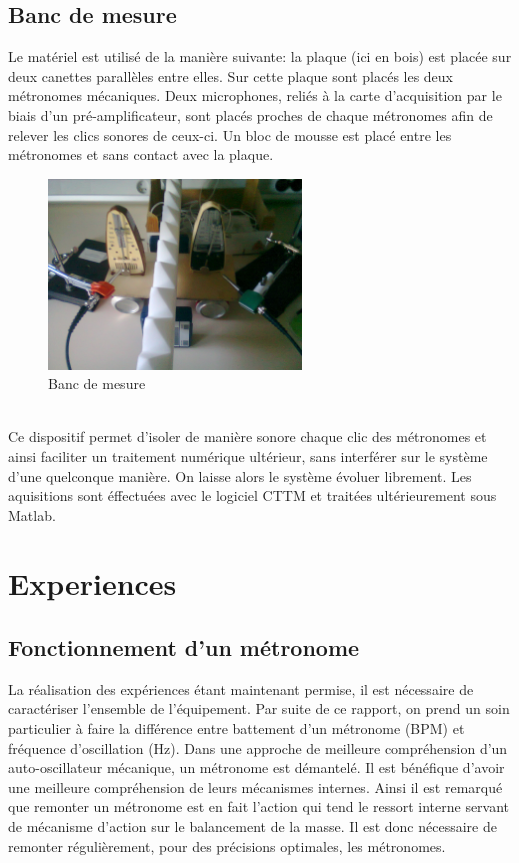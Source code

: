 \documentclass[a4paper,11pt]{report}
\begin{document}
\section{Banc de mesure}

Le matériel est utilisé de la manière suivante: la plaque (ici en bois) est placée sur deux canettes parallèles entre elles. Sur cette plaque sont placés les deux métronomes mécaniques. Deux microphones, reliés à la carte d'acquisition par le biais d'un pré-amplificateur, sont placés proches de chaque métronomes afin de relever les clics sonores de ceux-ci. Un bloc de mousse est placé entre les métronomes et sans contact avec la plaque.\\
\begin{figure}[h]
\centering
\includegraphics[width=0.6\textwidth]{BancMesure}
\caption{Banc de mesure}\label{Banc}
\end{figure}\\
Ce dispositif permet d'isoler de manière sonore chaque clic des métronomes et ainsi faciliter un traitement numérique ultérieur, sans interférer sur le système d'une quelconque manière. On laisse alors le système évoluer librement. Les aquisitions sont éffectuées avec le logiciel CTTM et traitées ultérieurement sous Matlab.
\chapter{Experiences}
\section{Fonctionnement d'un métronome}
La réalisation des expériences étant maintenant permise, il est nécessaire de caractériser  l'ensemble de l'équipement. Par suite de ce rapport, on prend un soin particulier à faire la différence entre battement d'un métronome (BPM) et fréquence d'oscillation (Hz). Dans une approche de meilleure compréhension d'un auto-oscillateur mécanique, un métronome est  démantelé. Il est bénéfique d'avoir une meilleure compréhension de leurs mécanismes internes. Ainsi il est remarqué que remonter un métronome est en fait l'action qui tend le ressort interne servant de mécanisme d'action sur le balancement de la masse. Il est donc nécessaire de remonter régulièrement, pour des précisions optimales, les métronomes.
\end{document}
